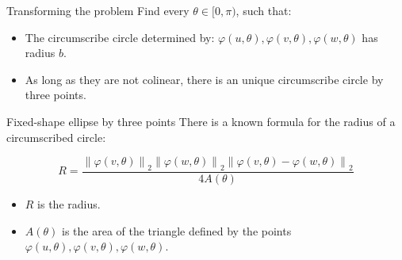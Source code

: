 \documentclass{beamer}
\newcommand{\norm}[2][2]{\left\lVert#2\right\rVert_{#1}}
\begin{document}
\begin{frame}{Transforming the problem}
	Find every $\theta \in [0, \pi)$, such that:
	
	\begin{itemize}
		\item The circumscribe circle determined by: $\varphi(u, \theta), \varphi(v, \theta), \varphi(w, \theta)$ has radius $b$.
		
		\item As long as they are not colinear, there is an unique circumscribe circle by three points.
		
	\end{itemize}

	

\end{frame}

\begin{frame}{Fixed-shape ellipse by three points}
	There is a known formula for the radius of a circumscribed circle:

	\begin{equation*}
	R = \dfrac{\norm{\varphi(v, \theta)}\norm{\varphi(w, \theta)}\norm{\varphi(v, \theta)-\varphi(w, \theta)}   }{4A(\theta)}
	\end{equation*}
	
	\begin{itemize}
		\item $R$ is the radius.
		\item $A(\theta)$ is the area of the triangle defined by the points $\varphi(u, \theta), \varphi(v, \theta), \varphi(w, \theta)$.
	\end{itemize}
	\vspace{\baselineskip}
	

												
\end{frame}
\end{document}
